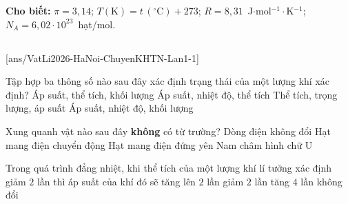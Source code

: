 \def\CheDo{solcolor}%
\def\tenchuong{THPT chuyên KHTN, Hà Nội -- Lần 1}
\def\thuonghieu{VẬT LÍ 12 -- Eduzy.com.vn}
\def\TachCauDS{1}
\def\TachCauLG{1}




	\noindent\textbf{Cho biết:} $\pi=3{,}14$; $T(\text{K})=t\,(^\circ\text{C})+273$; $R=8{,}31$~J$\cdot$mol$^{-1}\cdot$K$^{-1}$; $N_A=6{,}02\cdot 10^{23}$~hạt/mol.

	\noindent
	\subsection*{}
	\setcounter{ex}{0}
	[ans/VatLi2026-HaNoi-ChuyenKHTN-Lan1-1]

	\begin{ex}%
		Tập hợp ba thông số nào sau đây xác định trạng thái của một lượng khí xác định?
		\choice
		{Áp suất, thể tích, khối lượng}
		{\True Áp suất, nhiệt độ, thể tích}
		{Thể tích, trọng lượng, áp suất}
		{Áp suất, nhiệt độ, khối lượng}
	\end{ex}

	\begin{ex}%
		Xung quanh vật nào sau đây \textbf{không} có từ trường?
		\choice
		{Dòng điện không đổi}
		{Hạt mang điện chuyển động}
		{\True Hạt mang điện đứng yên}
		{Nam châm hình chữ U}
	\end{ex}

	\begin{ex}%
		Trong quá trình đẳng nhiệt, khi thể tích của một lượng khí lí tưởng xác định giảm $2$ lần thì áp suất của khí đó sẽ
		\choice
		{\True tăng lên $2$ lần}
		{giảm $2$ lần}
		{tăng $4$ lần}
		{không đổi}
	\end{ex}

